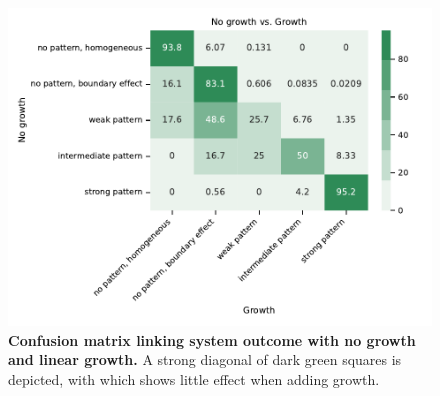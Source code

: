 \begin{figure}[H] %
    \centering
    \begin{adjustbox}{center}
        \includegraphics[width=1\textwidth]{chapters/Chapter 1/openboundary_edgegrowth2_confusion_variant0-11-12} %
    \end{adjustbox}
    \caption{\textbf{Confusion matrix linking system outcome with no growth and linear growth.} A strong diagonal of dark green squares is depicted, with which shows little effect when adding growth.}
    \label{fig:openboundary_edgegrowth2_confusion_variant0} %
\end{figure}


